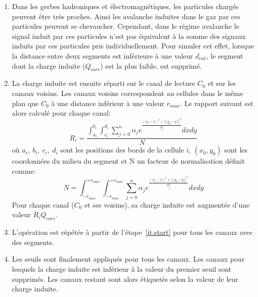 \begin{enumerate}[~~1-]
\item Dans les gerbes hadroniques et électromagnétiques, les particules chargés peuvent être très proches. Ainsi les avalanche induites dans le gaz par ces particules peuvent se chevaucher. Cependant, dans le régime avalanche le signal induit par ces particules n'est pas équivalent à la somme des signaux induits par ces particules pris individuellement. Pour simuler cet effet, lorsque la distance entre deux segments est inférieure à une valeur $d_{cut}$, le segment dont la charge induite ($Q_{corr}$) est la plus faible, est supprimé. %
\item \label{it.spliting} La charge induite est ensuite réparti sur le canal de lecture $C_0$  et sur les canaux voisins. Les canaux voisins correspondent au cellules dans le même plan que $C_0$ à une distance inférieur à une valeur $r_{max}$. Le rapport suivant est alors calculé pour chaque canal:
  \begin{equation}
    \label{eq.ratio}
    R_i = \frac{\int_{a_i}^{b_i}\int_{c_i}^{d_i}\sum_{j=0}^{n}\alpha_j e^{ \frac{(x_0-x)^2+(y_0-y)^2}{\sigma_j^2}}dxdy}{N}
  \end{equation}
  où $a_i,\ b_i,\ c_i,\ d_i$ sont les positions des bords de la cellule $i$, $(x_0,y_0)$ sont les coordonnées du milieu du segment et N un facteur de normalisation définit comme: 
  \begin{equation}
    \label{eq.norm}
    N=\int_{-r_{max}}^{+r_{max}}\int_{-r_{max}}^{+r_{max}}\sum_{j=0}^{n}\alpha_j e^{ \frac{(x_0-x)^2+(y_0-y)^2}{\sigma_j^2}}dxdy
  \end{equation}
  Pour chaque canal ($C_0$ et ses voisins), sa charge induite est augmentée d'une valeur $R_iQ_{corr}$.
\item L'opération est répétée à partir de l'étape~\ref{it.start} pour tous les canaux avec des segments.
\item Les seuils sont finalement appliqués pour tous les canaux. Les canaux pour lesquels la charge induite est inférieur à la valeur du premier seuil sont supprimés. Les canaux restant sont alors étiquetés selon la valeur de leur charge induite. 
\end{enumerate}


